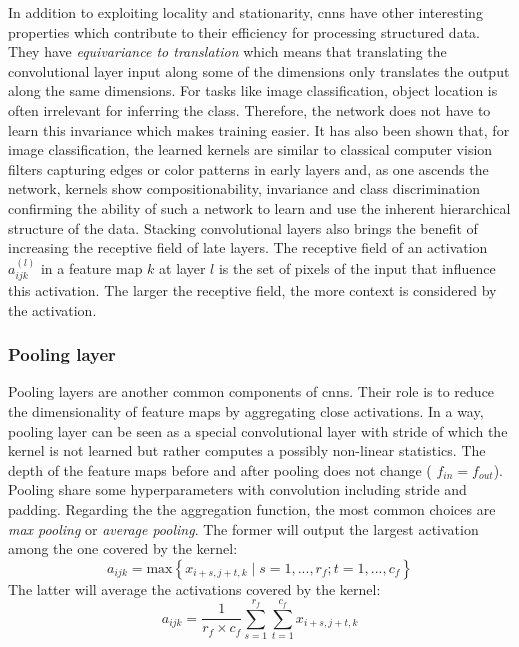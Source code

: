 In addition to exploiting locality and stationarity, \acrshort{cnn}s have other
interesting properties which contribute to their efficiency for processing structured
data. They have \textit{equivariance to translation} which means that translating
the convolutional layer input along some of the dimensions only translates the
output along the same dimensions. For tasks like image classification, object
location is often irrelevant for inferring the class. Therefore, the network does
not have to learn this invariance which makes training easier. It has also been
shown that, for image classification, the learned kernels are similar to classical
computer vision filters capturing edges or color patterns in early layers and, as
one ascends the network, kernels show compositionability, invariance and class
discrimination \parencite{zeiler2014visualizing} confirming the ability of such
a network to learn and use the inherent hierarchical structure of the data. Stacking
convolutional layers also brings the benefit of increasing the receptive field of
late layers. The receptive field of an activation $a^{(l)}_{ijk}$ in a feature
map $k$ at layer $l$ is the set of pixels of the input that influence this
activation. The larger the receptive field, the more context is considered by the
activation.

\subsubsection{Pooling layer}
\label{sssec:backml:poolinglayer}

Pooling layers are another common components of \acrshort{cnn}s. Their role is to
reduce the dimensionality of feature maps by aggregating close activations. In a
way, pooling layer can be seen as a special convolutional layer with stride of
which the kernel is not learned but rather computes a possibly non-linear statistics.
The depth of the feature maps before and after pooling does not change (\ie
$f_{in} = f_{out}$). Pooling share some hyperparameters with convolution including
stride and padding. Regarding the the aggregation function, the most common choices
are \textit{max pooling} or \textit{average pooling}. The former will output the
largest activation among the one covered by the kernel:
\begin{equation}
\label{eqn:backml:maxpooling}
a_{ijk} = \text{max} \left\{ x_{i+s,j+t,k} \mid s = 1, ..., r_f; t = 1, ..., c_f \right\}
\end{equation}
The latter will average the activations covered by the kernel:
\begin{equation}
\label{eqn:backml:avgpooling}
a_{ijk} = \frac{1}{r_f \times c_f} \sum_{s=1}^{r_f} \sum_{t=1}^{c_f}  x_{i+s,j+t,k}
\end{equation}

